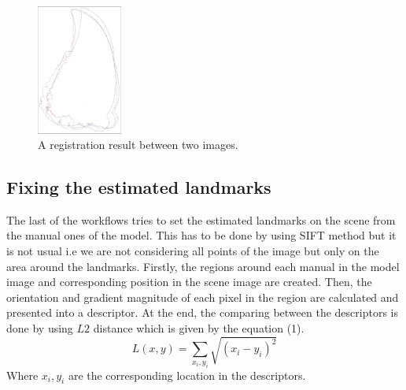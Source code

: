 \documentclass[twoside,twocolumn,10pt]{article}
\begin{document}
\begin{figure}[htb]
    \centering
    \includegraphics[width=0.25\textwidth]{./images/imreg}
    \caption{A registration result between two images.}
    \label{fig:box}
\end{figure}
\subsection{Fixing the estimated landmarks}
The last of the workflows tries to set the estimated landmarks on the scene from the manual ones of the model. This has to be done by using SIFT\cite{lowe2004distinctive} method but it is not usual i.e we are not considering all points of the image but only on the area around the landmarks. Firstly, the regions around each manual in the model image and corresponding position in the scene image are created. Then, the orientation and gradient magnitude of each pixel in the region are calculated and presented into a descriptor. At the end, the comparing between the descriptors is done by using $L2$ distance which is given by the equation (1).
\begin{equation}
\label{eq:cross-correlation}
	L(x,y) = \sum\limits_{x_i,y_i}\sqrt{(x_i-y_i)^2}
\end{equation}
Where $x_i, y_i $ are the corresponding location in the descriptors.\\
\end{document}
